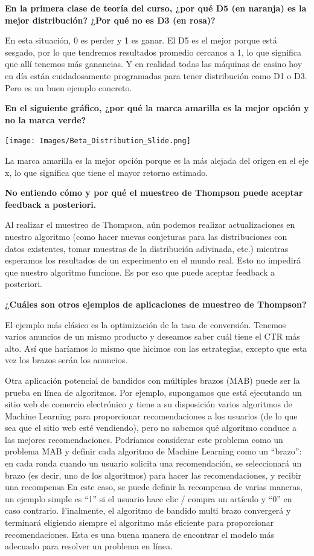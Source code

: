 \documentclass[
]{book}
\begin{document}
\textbf{En la primera clase de teoría del curso, ¿por qué D5 (en naranja) es la mejor distribución? ¿Por qué no es D3 (en rosa)?}

En esta situación, 0 es perder y 1 es ganar. El D5 es el mejor porque está sesgado, por lo que tendremos resultados promedio cercanos a 1, lo que significa que allí tenemos más ganancias. Y en realidad todas las máquinas de casino hoy en día están cuidadosamente programadas para tener distribución como D1 o D3. Pero es un buen ejemplo concreto.

\textbf{En el siguiente gráfico, ¿por qué la marca amarilla es la mejor opción y no la marca verde?}

\texttt{[image: Images/Beta\_Distribution\_Slide.png]}

La marca amarilla es la mejor opción porque es la más alejada del origen en el eje x, lo que significa que tiene el mayor retorno estimado.

\textbf{No entiendo cómo y por qué el muestreo de Thompson puede aceptar feedback a posteriori.}

Al realizar el muestreo de Thompson, aún podemos realizar actualizaciones en nuestro algoritmo (como hacer nuevas conjeturas para las distribuciones con datos existentes, tomar muestras de la distribución adivinada, etc.) mientras esperamos los resultados de un experimento en el mundo real. Esto no impedirá que nuestro algoritmo funcione. Es por eso que puede aceptar feedback a posteriori.

\textbf{¿Cuáles son otros ejemplos de aplicaciones de muestreo de Thompson?}

El ejemplo más clásico es la optimización de la tasa de conversión. Tenemos varios anuncios de un mismo producto y deseamos saber cuál tiene el CTR más alto. Así que haríamos lo mismo que hicimos con las estrategias, excepto que esta vez los brazos serán los anuncios.

Otra aplicación potencial de bandidos con múltiples brazos (MAB) puede ser la prueba en línea de algoritmos. Por ejemplo, supongamos que está ejecutando un sitio web de comercio electrónico y tiene a su disposición varios algoritmos de Machine Learning para proporcionar recomendaciones a los usuarios (de lo que sea que el sitio web esté vendiendo), pero no sabemos qué algoritmo conduce a las mejores recomendaciones. Podríamos considerar este problema como un problema MAB y definir cada algoritmo de Machine Learning como un ``brazo'': en cada ronda cuando un usuario solicita una recomendación, se seleccionará un brazo (es decir, uno de los algoritmos) para hacer las recomendaciones, y recibir una recompensa En este caso, se puede definir la recompensa de varias maneras, un ejemplo simple es ``1'' si el usuario hace clic / compra un artículo y ``0'' en caso contrario. Finalmente, el algoritmo de bandido multi brazo convergerá y terminará eligiendo siempre el algoritmo más eficiente para proporcionar recomendaciones. Esta es una buena manera de encontrar el modelo más adecuado para resolver un problema en línea.
\end{document}
